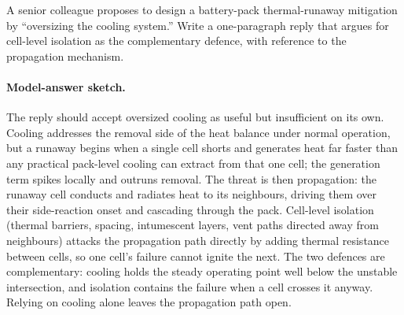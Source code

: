 \begin{exercise}
A senior colleague proposes to design a battery-pack thermal-runaway
mitigation by ``oversizing the cooling system.'' Write a one-paragraph
reply that argues for cell-level isolation as the complementary
defence, with reference to the propagation mechanism.
\paragraph{Model-answer sketch.} The reply should accept oversized
cooling as useful but insufficient on its own. Cooling addresses the
removal side of the heat balance under normal operation, but a runaway
begins when a single cell shorts and generates heat far faster than any
practical pack-level cooling can extract from that one cell; the
generation term spikes locally and outruns removal. The threat is then
propagation: the runaway cell conducts and radiates heat to its
neighbours, driving them over their side-reaction onset and cascading
through the pack. Cell-level isolation (thermal barriers, spacing,
intumescent layers, vent paths directed away from neighbours) attacks
the propagation path directly by adding thermal resistance between cells,
so one cell's failure cannot ignite the next. The two defences are
complementary: cooling holds the steady operating point well below the
unstable intersection, and isolation contains the failure when a cell
crosses it anyway. Relying on cooling alone leaves the propagation path
open.
\end{exercise}
